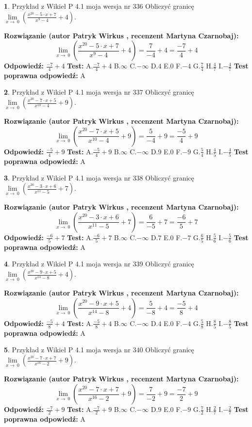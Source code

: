 \documentclass[12pt, a4paper]{article}
\theoremstyle{definition} %
\newtheorem{zad}{}
\newcommand{\zadStart}[1]{\begin{zad}#1\newline}
\newcommand{\zadStop}{\end{zad}}
\newcommand{\rozwStart}[2]{\noindent \textbf{Rozwiązanie (autor #1 , recenzent #2): }\newline}
\newcommand{\rozwStop}{\newline}
\newcommand{\odpStart}{\noindent \textbf{Odpowiedź:}\newline}
\newcommand{\odpStop}{\newline}
\newcommand{\testStart}{\noindent \textbf{Test:}\newline}
\newcommand{\testStop}{\newline}
\newcommand{\kluczStart}{\noindent \textbf{Test poprawna odpowiedź:}\newline}
\newcommand{\kluczStop}{\newline}
\begin{document}
\zadStart{Przykład z Wikieł P 4.1 moja wersja nr 336}
Obliczyć granicę $\lim\limits_{x\to\ 0}(\frac{x^{20}-5 \cdot x +7}{x^{9}-4}+4)$.
\zadStop
\rozwStart{Patryk Wirkus}{Martyna Czarnobaj}
$$\lim\limits_{x\to\ 0}(\frac{x^{20}-5 \cdot x +7}{x^{9}-4}+4)=\frac{7}{-4}+4=\frac{-7}{4}+4$$
\rozwStop
\odpStart
$\frac{-7}{4}+4$
\odpStop
\testStart
A.$\frac{-7}{4}+4$
B.$\infty$
C.$-\infty$
D.$4$
E.$0$
F.$-4$
G.$\frac{7}{4}$
H.$\frac{4}{7}$
I.$-\frac{4}{7}$
\testStop
\kluczStart
A
\kluczStop



\zadStart{Przykład z Wikieł P 4.1 moja wersja nr 337}
Obliczyć granicę $\lim\limits_{x\to\ 0}(\frac{x^{20}-7 \cdot x +5}{x^{10}-4}+9)$.
\zadStop
\rozwStart{Patryk Wirkus}{Martyna Czarnobaj}
$$\lim\limits_{x\to\ 0}(\frac{x^{20}-7 \cdot x +5}{x^{10}-4}+9)=\frac{5}{-4}+9=\frac{-5}{4}+9$$
\rozwStop
\odpStart
$\frac{-5}{4}+9$
\odpStop
\testStart
A.$\frac{-5}{4}+9$
B.$\infty$
C.$-\infty$
D.$9$
E.$0$
F.$-9$
G.$\frac{5}{4}$
H.$\frac{4}{5}$
I.$-\frac{4}{5}$
\testStop
\kluczStart
A
\kluczStop



\zadStart{Przykład z Wikieł P 4.1 moja wersja nr 338}
Obliczyć granicę $\lim\limits_{x\to\ 0}(\frac{x^{20}-3 \cdot x +6}{x^{11}-5}+7)$.
\zadStop
\rozwStart{Patryk Wirkus}{Martyna Czarnobaj}
$$\lim\limits_{x\to\ 0}(\frac{x^{20}-3 \cdot x +6}{x^{11}-5}+7)=\frac{6}{-5}+7=\frac{-6}{5}+7$$
\rozwStop
\odpStart
$\frac{-6}{5}+7$
\odpStop
\testStart
A.$\frac{-6}{5}+7$
B.$\infty$
C.$-\infty$
D.$7$
E.$0$
F.$-7$
G.$\frac{6}{5}$
H.$\frac{5}{6}$
I.$-\frac{5}{6}$
\testStop
\kluczStart
A
\kluczStop



\zadStart{Przykład z Wikieł P 4.1 moja wersja nr 339}
Obliczyć granicę $\lim\limits_{x\to\ 0}(\frac{x^{20}-9 \cdot x +5}{x^{14}-8}+4)$.
\zadStop
\rozwStart{Patryk Wirkus}{Martyna Czarnobaj}
$$\lim\limits_{x\to\ 0}(\frac{x^{20}-9 \cdot x +5}{x^{14}-8}+4)=\frac{5}{-8}+4=\frac{-5}{8}+4$$
\rozwStop
\odpStart
$\frac{-5}{8}+4$
\odpStop
\testStart
A.$\frac{-5}{8}+4$
B.$\infty$
C.$-\infty$
D.$4$
E.$0$
F.$-4$
G.$\frac{5}{8}$
H.$\frac{8}{5}$
I.$-\frac{8}{5}$
\testStop
\kluczStart
A
\kluczStop



\zadStart{Przykład z Wikieł P 4.1 moja wersja nr 340}
Obliczyć granicę $\lim\limits_{x\to\ 0}(\frac{x^{20}-7 \cdot x +7}{x^{16}-2}+9)$.
\zadStop
\rozwStart{Patryk Wirkus}{Martyna Czarnobaj}
$$\lim\limits_{x\to\ 0}(\frac{x^{20}-7 \cdot x +7}{x^{16}-2}+9)=\frac{7}{-2}+9=\frac{-7}{2}+9$$
\rozwStop
\odpStart
$\frac{-7}{2}+9$
\odpStop
\testStart
A.$\frac{-7}{2}+9$
B.$\infty$
C.$-\infty$
D.$9$
E.$0$
F.$-9$
G.$\frac{7}{2}$
H.$\frac{2}{7}$
I.$-\frac{2}{7}$
\testStop
\kluczStart
A
\kluczStop
\end{document}
